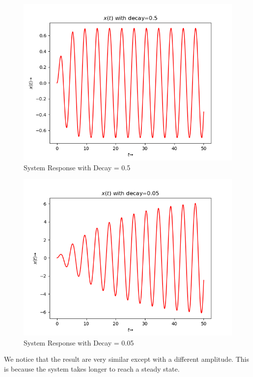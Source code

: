 \documentclass{article}
\begin{document}
\begin{figure}[h!]
\centering
\includegraphics[scale=0.4]{fig1_6.png}
\caption{System Response with Decay = 0.5}
\label{fig:System Response with Decay = 0.5}
\end{figure}



\begin{figure}[h!]
\centering
\includegraphics[scale=0.4]{fig2_6.png}
\caption{System Response with Decay = 0.05}
\label{fig:System Response with Decay = 0.05}
\end{figure}
\clearpage
We notice that the result are very similar except with a different amplitude. This is because the system takes longer to reach a steady state.
\end{document}
